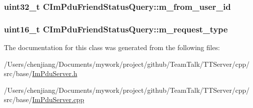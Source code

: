 \subsubsection[{m\+\_\+from\+\_\+user\+\_\+id}]{\setlength{\rightskip}{0pt plus 5cm}uint32\+\_\+t C\+Im\+Pdu\+Friend\+Status\+Query\+::m\+\_\+from\+\_\+user\+\_\+id\hspace{0.3cm}{\ttfamily [private]}}\label{class_c_im_pdu_friend_status_query_ada501bf3c1cecca3102fcf13bf615a71}
\hypertarget{class_c_im_pdu_friend_status_query_a08ecbef92170159375d9d3f281ecd01c}{}
\subsubsection[{m\+\_\+request\+\_\+type}]{\setlength{\rightskip}{0pt plus 5cm}uint16\+\_\+t C\+Im\+Pdu\+Friend\+Status\+Query\+::m\+\_\+request\+\_\+type\hspace{0.3cm}{\ttfamily [private]}}\label{class_c_im_pdu_friend_status_query_a08ecbef92170159375d9d3f281ecd01c}


The documentation for this class was generated from the following files\+:\begin{DoxyCompactItemize}
\item 
/\+Users/chenjiang/\+Documents/mywork/project/github/\+Team\+Talk/\+T\+T\+Server/cpp/src/base/\hyperlink{_im_pdu_server_8h}{Im\+Pdu\+Server.\+h}\item 
/\+Users/chenjiang/\+Documents/mywork/project/github/\+Team\+Talk/\+T\+T\+Server/cpp/src/base/\hyperlink{_im_pdu_server_8cpp}{Im\+Pdu\+Server.\+cpp}\end{DoxyCompactItemize}
